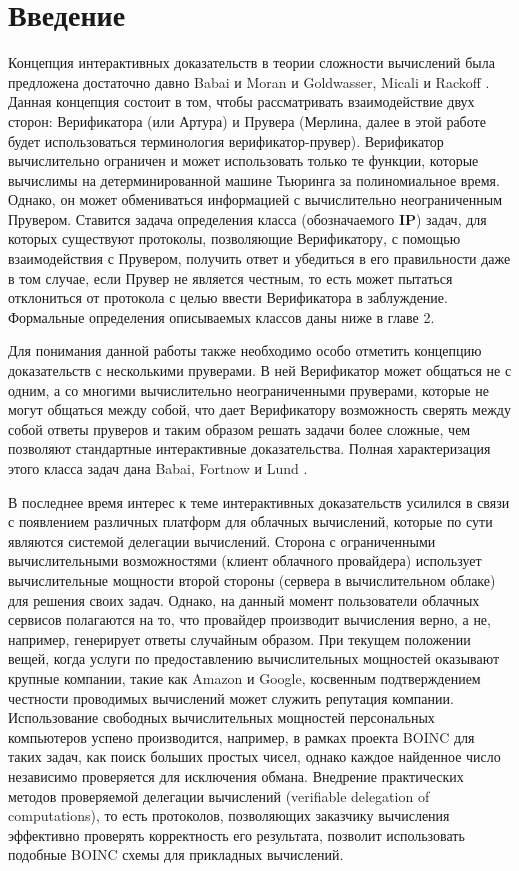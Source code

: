 \documentclass[14pt, a4paper, russian]{report}
\begin{document}
\chapter{Введение}
Концепция интерактивных доказательств в теории сложности вычислений была предложена достаточно давно Babai и Moran \cite{babai1988arthur} и Goldwasser, Micali и Rackoff \cite{goldwasser1989ip}. Данная концепция состоит в том, чтобы рассматривать взаимодействие двух сторон: Верификатора (или Артура) и Прувера (Мерлина, далее в этой работе будет использоваться терминология верификатор-прувер). Верификатор вычислительно ограничен и может использовать только те функции, которые вычислимы на детерминированной машине Тьюринга за полиномиальное время. Однако, он может обмениваться информацией с вычислительно неограниченным Прувером. Ставится задача определения класса (обозначаемого $\textbf{IP}$) задач, для которых существуют протоколы, позволяющие Верификатору, с помощью взаимодействия с Прувером, получить ответ и убедиться в его правильности даже в том случае, если Прувер не является честным, то есть может пытаться отклониться от протокола с целью ввести Верификатора в заблуждение. Формальные определения описываемых классов даны ниже в главе 2.

Для понимания данной работы также необходимо особо отметить концепцию доказательств с несколькими пруверами. В ней Верификатор может общаться не с одним, а со многими вычислительно неограниченными пруверами, которые не могут общаться между собой, что дает Верификатору возможность сверять между собой ответы пруверов и таким образом решать задачи более сложные, чем позволяют стандартные интерактивные доказательства. Полная характеризация этого класса задач дана Babai, Fortnow и Lund \cite{babai1991mip}.

В последнее время интерес к теме интерактивных доказательств усилился в связи с появлением различных платформ для облачных вычислений, которые по сути являются системой делегации вычислений. Сторона с ограниченными вычислительными возможностями (клиент облачного провайдера) использует вычислительные мощности второй стороны (сервера в вычислительном облаке) для решения своих задач. Однако, на данный момент пользователи облачных сервисов полагаются на то, что провайдер производит вычисления верно, а не, например, генерирует ответы случайным образом. При текущем положении вещей, когда услуги по предоставлению вычислительных мощностей оказывают крупные компании, такие как Amazon и Google, косвенным подтверждением честности проводимых вычислений может служить репутация компании. Использование свободных вычислительных мощностей персональных компьютеров успено производится, например, в рамках проекта BOINC \cite{anderson2004boinc} для таких задач, как поиск больших простых чисел, однако каждое найденное число независимо проверяется для исключения обмана. Внедрение практических методов проверяемой делегации вычислений (verifiable delegation of computations), то есть протоколов, позволяющих заказчику вычисления эффективно проверять корректность его результата, позволит использовать подобные BOINC схемы для прикладных вычислений.
\end{document}
